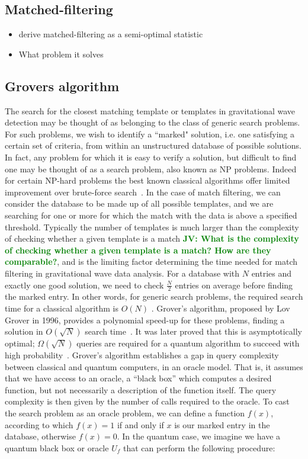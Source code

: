 \documentclass[aps,prd,nofootinbib,twocolumn,reprint,superscriptaddress,showpacs,showkeys,longbibliography]{revtex4-1}
\newcommand{\jv}[1]{\textbf{\textcolor{green}{JV: #1}}}
\begin{document}
\subsection{Matched-filtering}

\begin{itemize}
\item derive matched-filtering as a semi-optimal statistic
\item What problem it solves
\end{itemize}

\subsection{Grovers algorithm}

The search for the closest matching template or templates in gravitational wave detection may be thought of as belonging to the class of generic search problems. For such problems, we wish to identify a ``marked" solution, i.e. one satisfying a certain set of criteria, from within an unstructured database of possible solutions. In fact, any problem for which it is easy to verify a solution, but difficult to find one may be thought of as a search problem, also known as NP problems. Indeed for certain NP-hard problems the best known classical algorithms offer limited improvement over brute-force search~\cite{bennett1997strengths}. In the case of match filtering, we can consider the database to be made up of all possible templates, and we are searching for one or more for which the match with the data is above a specified threshold. Typically the number of templates is much larger than the complexity of checking whether a given template is a match \jv{What is the complexity of checking whether a given template is a match? How are they comparable?}, and is the limiting factor determining the time needed for match filtering in gravitational wave data analysis. For a database with $N$ entries and exactly one good solution, we need to check $\frac{N}{2}$ entries on average before finding the marked entry. In other words, for generic search problems, the required search time for a classical algorithm is $O(N)$ \cite{barnett2009quantum}. Grover's algorithm, proposed by Lov Grover in 1996, provides a polynomial speed-up for these problems, finding a solution in $O(\sqrt{N})$ search time~\cite{grover1996fast}. It was later proved that this is asymptotically optimal; $\Omega(\sqrt{N})$ queries are required for a quantum algorithm to succeed with high probability~\cite{bennett1997strengths}.
\newline\newline Grover's algorithm establishes a gap in query complexity between classical and quantum computers, in an oracle model. That is, it assumes that we have access to an oracle, a ``black box'' which computes a desired function, but not necessarily a description of the function itself. The query complexity is then given by the number of calls required to the oracle. To cast the search problem as an oracle problem, we can define a function $f(x)$, according to which $f(x)=1$ if and only if $x$ is our marked entry in the database, otherwise $f(x)=0$. In the quantum case, we imagine we have a quantum black box or oracle $U_f$ that can perform the following procedure:
\end{document}
